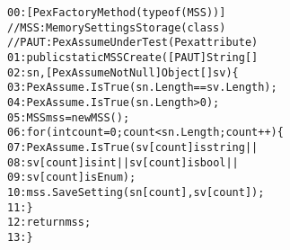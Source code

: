 \begin{figure}[t]
\begin{CodeOut}
\begin{alltt}
00:[PexFactoryMethod(typeof(MSS))]
\hspace*{0.3in}//MSS: MemorySettingsStorage (class)
\hspace*{0.3in}//PAUT: PexAssumeUnderTest	(Pex attribute)
01:public static MSS Create([PAUT]String[] 
02:\hspace*{0.3in}sn, [PexAssumeNotNull]Object[] sv) \{
03:\hspace*{0.2in}PexAssume.IsTrue(sn.Length == sv.Length);
04:\hspace*{0.2in}PexAssume.IsTrue(sn.Length > 0);
05:\hspace*{0.2in}MSS mss = new MSS();
06:\hspace*{0.2in}for (int count = 0; count < sn.Length; count++) \{
07:\hspace*{0.3in}PexAssume.IsTrue(sv[count] is string ||
08:\hspace*{0.4in}sv[count] is int || sv[count] is bool || 
09:\hspace*{0.4in}sv[count] is Enum);
10:\hspace*{0.3in}mss.SaveSetting(sn[count], sv[count]);
11:\hspace*{0.2in}\}
12:\hspace*{0.2in}return mss;            
13:\}
\end{alltt}
\end{CodeOut}
\end{figure}


